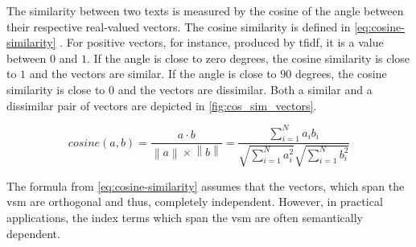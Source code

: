 
The similarity between two texts is measured by the cosine of the angle between their respective real-valued vectors.
The cosine similarity is defined in \autoref{eq:cosine-similarity} \cite{soft_cosine2014}.
For positive vectors, for instance, produced by \ac{tfidf}, it is a value between $0$ and $1$.
If the angle is close to zero degrees, the cosine similarity is close to $1$ and the vectors are similar.
If the angle is close to $90$ degrees, the cosine similarity is close to $0$ and the vectors are dissimilar.
Both a similar and a dissimilar pair of vectors are depicted in \autoref{fig:cos_sim_vectors}.

\begin{equation}
    cosine(a,b) = \frac{a \cdot b}{\left\| a \right\| \times \left\| b \right\|} = \frac{\sum_{i=1}^{N}a_{i}b_{i}}{\sqrt{\sum_{i=1}^{N}{a}^2_{i}}\sqrt{\sum_{i=1}^{N}{b}^2_{i}}}
    \label{eq:cosine-similarity}
\end{equation}

The formula from \autoref{eq:cosine-similarity} assumes that the vectors, which span the \ac{vsm} are orthogonal and thus, 
completely independent.
However, in practical applications, the index terms which span the \ac{vsm} are often semantically dependent.

%